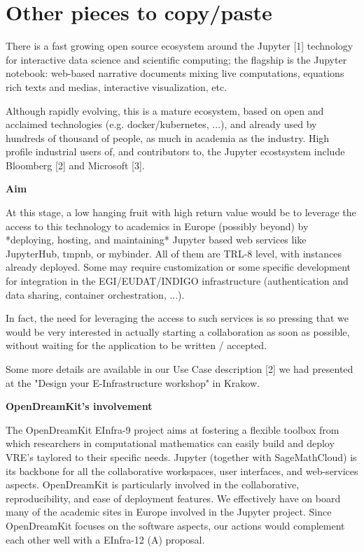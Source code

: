 \section*{Other pieces to copy/paste}

There is a fast growing open source ecosystem around the Jupyter [1]
technology for interactive data science and scientific computing; the
flagship is the Jupyter notebook: web-based narrative documents mixing
live computations, equations rich texts and medias, interactive
visualization, etc.

Although rapidly evolving, this is a mature ecosystem, based on open
and acclaimed technologies (e.g. docker/kubernetes, ...), and already
used by hundreds of thousand of people, as much in academia as the
industry. High profile industrial users of, and contributors to, the
Jupyter ecostsystem include Bloomberg [2] and Microsoft [3].

\textbf{Aim}

At this stage, a low hanging fruit with high return value would be to
leverage the access to this technology to academics in Europe
(possibly beyond) by *deploying, hosting, and maintaining* Jupyter
based web services like JupyterHub, tmpnb, or mybinder. All of them
are TRL-8 level, with instances already deployed. Some may require
customization or some specific development for integration in the
EGI/EUDAT/INDIGO infrastructure (authentication and data sharing,
container orchestration, ...).

In fact, the need for leveraging the access to such services is so
pressing that we would be very interested in actually starting a
collaboration as soon as possible, without waiting for the application
to be written / accepted.

Some more details are available in our Use Case description [2] we had
presented at the "Design your E-Infrastructure workshop" in Krakow.

\textbf{OpenDreamKit's involvement}

The OpenDreamKit EInfra-9 project aims at fostering a flexible toolbox
from which researchers in computational mathematics can easily build
and deploy VRE's taylored to their specific needs. Jupyter (together
with SageMathCloud) is its backbone for all the collaborative
workspaces, user interfaces, and web-services aspects. OpenDreamKit is
particularly involved in the collaborative, reproducibility, and ease
of deployment features. We effectively have on board many of the
academic sites in Europe involved in the Jupyter project. Since
OpenDreamKit focuses on the software aspects, our actions would
complement each other well with a EInfra-12 (A) proposal.

